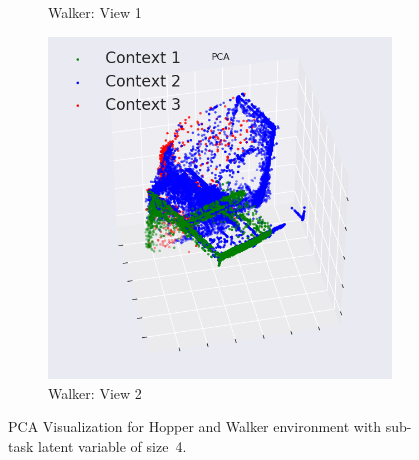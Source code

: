 \documentclass{article} %
\begin{document}
\begin{figure}
\begin{subfigure}{0.33\columnwidth}
    \caption{Walker: View 1}
    \end{subfigure}%
    \begin{subfigure}{0.33\columnwidth}
    \centering
    \includegraphics[scale=0.17]{figures/pca/pca_walker_expert_3.png}
    \caption{Walker: View 2}
    \end{subfigure}%
    
    \caption{PCA Visualization for Hopper and Walker environment with sub-task latent variable of size~4.}
    \label{fig:pca}
\end{figure}
\end{document}
